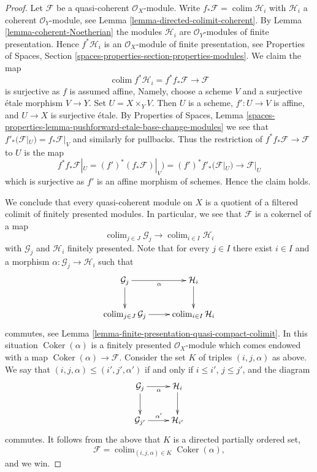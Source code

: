 \documentclass{stacks-project}
\theoremstyle{plain}
\theoremstyle{definition}
\theoremstyle{remark}
\numberwithin{equation}{subsection}
\def\colim{\mathop{\mathrm{colim}}\nolimits}
\def\Coker{\mathop{\mathrm{Coker}}}
\begin{document}
\begin{proof}
Let $\mathcal{F}$ be a quasi-coherent $\mathcal{O}_X$-module.
Write $f_*\mathcal{F} = \colim \mathcal{H}_i$ with $\mathcal{H}_i$
a coherent $\mathcal{O}_Y$-module, see
Lemma \ref{lemma-directed-colimit-coherent}.
By Lemma \ref{lemma-coherent-Noetherian} the modules $\mathcal{H}_i$
are $\mathcal{O}_Y$-modules of finite presentation. Hence
$f^*\mathcal{H}_i$ is an $\mathcal{O}_X$-module of finite presentation, see
Properties of Spaces, Section
\ref{spaces-properties-section-properties-modules}.
We claim the map
$$
\colim f^*\mathcal{H}_i = f^*f_*\mathcal{F} \to \mathcal{F}
$$
is surjective as $f$ is assumed affine, Namely, choose
a scheme $V$ and a surjective \'etale morphism $V \to Y$. Set
$U = X \times_Y V$. Then $U$ is a scheme, $f' : U \to V$ is affine, and
$U \to X$ is surjective \'etale. By
Properties of Spaces, Lemma
\ref{spaces-properties-lemma-pushforward-etale-base-change-modules}
we see that $f'_*(\mathcal{F}|_U) = f_*\mathcal{F}|_V$ and similarly
for pullbacks. Thus the restriction of $f^*f_*\mathcal{F} \to \mathcal{F}$
to $U$ is the map
$$
f^*f_*\mathcal{F}|_U = (f')^*(f_*\mathcal{F})|_V) =
(f')^*f'_*(\mathcal{F}|_U) \to \mathcal{F}|_U
$$
which is surjective as $f'$ is an affine morphism of schemes.
Hence the claim holds.

\medskip\noindent
We conclude that every quasi-coherent module on $X$ is a quotient of a
filtered colimit of finitely presented modules. In particular, we see that
$\mathcal{F}$ is a cokernel of a map
$$
\colim_{j \in J} \mathcal{G}_j \longrightarrow \colim_{i \in I} \mathcal{H}_i
$$
with $\mathcal{G}_j$ and $\mathcal{H}_i$ finitely presented. Note
that for every $j \in I$ there exist $i \in I$ and a morphism
$\alpha : \mathcal{G}_j \to \mathcal{H}_i$ such that
$$
\xymatrix{
\mathcal{G}_j \ar[r]_\alpha \ar[d] & \mathcal{H}_i \ar[d] \\
\colim_{j \in J} \mathcal{G}_j \ar[r] &
\colim_{i \in I} \mathcal{H}_i
}
$$
commutes, see
Lemma \ref{lemma-finite-presentation-quasi-compact-colimit}.
In this situation $\Coker(\alpha)$ is a finitely presented
$\mathcal{O}_X$-module which comes endowed with a map
$\Coker(\alpha) \to \mathcal{F}$. Consider the set $K$ of
triples $(i, j, \alpha)$ as above. We say that
$(i, j, \alpha) \leq (i', j', \alpha')$ if and only if
$i \leq i'$, $j \leq j'$, and the diagram
$$
\xymatrix{
\mathcal{G}_j \ar[r]_\alpha \ar[d] & \mathcal{H}_i \ar[d] \\
\mathcal{G}_{j'} \ar[r]^{\alpha'} &
\mathcal{H}_{i'}
}
$$
commutes. It follows from the above that $K$ is
a directed partially ordered set,
$$
\mathcal{F} = \colim_{(i, j, \alpha) \in K} \Coker(\alpha),
$$
and we win.
\end{proof}
\end{document}

